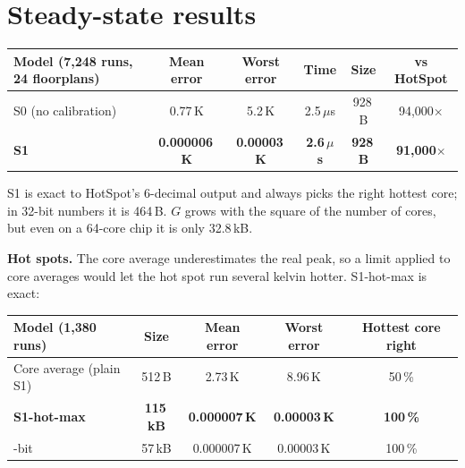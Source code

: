 \documentclass[11pt,a4paper]{article}
\newcommand{\us}{\,$\mu$s}
\begin{document}
\section{Steady-state results}
\begin{center}
\small
\begin{tabular}{@{}l c c c c c@{}}
\toprule
Model (7{,}248 runs, 24 floorplans) & Mean error & Worst error & Time & Size & vs HotSpot \\
\midrule
S0 (no calibration) & 0.77\,K & 5.2\,K & 2.5\us & 928\,B & 94{,}000$\times$ \\
\textbf{S1} & \textbf{0.000006\,K} & \textbf{0.00003\,K} & \textbf{2.6\us} & \textbf{928\,B} & \textbf{91{,}000$\times$} \\
\bottomrule
\end{tabular}
\end{center}
S1 is exact to HotSpot's 6-decimal output and always picks the right hottest core; in 32-bit
numbers it is 464\,B. $G$ grows with the square of the number of cores, but even on a 64-core chip
it is only 32.8\,kB.

\textbf{Hot spots.} The core average underestimates the real peak, so a limit applied to core
averages would let the hot spot run several kelvin hotter. S1-hot-max is exact:
\begin{center}
\small
\begin{tabular}{@{}l c c c c@{}}
\toprule
Model (1{,}380 runs) & Size & Mean error & Worst error & Hottest core right \\
\midrule
Core average (plain S1) & 512\,B & 2.73\,K & 8.96\,K & 50\,\% \\
\textbf{S1-hot-max} & \textbf{115\,kB} & \textbf{0.000007\,K} & \textbf{0.00003\,K} & \textbf{100\,\%} \\
\quad 32-bit & 57\,kB & 0.000007\,K & 0.00003\,K & 100\,\% \\
\bottomrule
\end{tabular}
\end{center}

\end{document}
